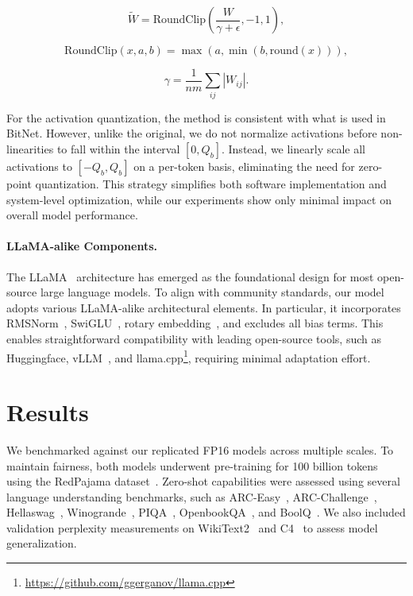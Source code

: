 \begin{equation}
    \widetilde{W} = \mathrm{RoundClip}(\frac{W}{\gamma + \epsilon}, -1, 1),
\end{equation}

\begin{equation}
    \mathrm{RoundClip}(x, a, b) = \max(a, \min(b, \mathrm{round}(x))),
\end{equation}

\begin{equation}
    \gamma = \frac{1}{nm}\sum_{ij} |W_{ij}|.
\end{equation}

For the activation quantization, the method is consistent with what is used in BitNet. However, unlike the original, we do not normalize activations before non-linearities to fall within the interval $[0, Q_b]$. Instead, we linearly scale all activations to $[-Q_b, Q_b]$ on a per-token basis, eliminating the need for zero-point quantization. This strategy simplifies both software implementation and system-level optimization, while our experiments show only minimal impact on overall model performance.

\paragraph{LLaMA-alike Components.}

The LLaMA~\cite{llama, llama2} architecture has emerged as the foundational design for most open-source large language models. To align with community standards, our  model adopts various LLaMA-alike architectural elements. In particular, it incorporates RMSNorm~\cite{rmsnorm}, SwiGLU~\cite{swiglu}, rotary embedding~\cite{rope}, and excludes all bias terms. This enables straightforward compatibility with leading open-source tools, such as Huggingface, vLLM~\cite{vllm}, and llama.cpp\footnote{\url{https://github.com/ggerganov/llama.cpp}}, requiring minimal adaptation effort.

\section{Results}

We benchmarked  against our replicated FP16  models across multiple scales. To maintain fairness, both models underwent pre-training for 100 billion tokens using the RedPajama dataset~\cite{redpajama}. Zero-shot capabilities were assessed using several language understanding benchmarks, such as ARC-Easy~\cite{arc}, ARC-Challenge~\cite{arc}, Hellaswag~\cite{hellaswag}, Winogrande~\cite{winoGrande}, PIQA~\cite{piqa}, OpenbookQA~\cite{openbookqa}, and BoolQ~\cite{boolq}. We also included validation perplexity measurements on WikiText2~\cite{wikitext2} and C4~\cite{c4} to assess model generalization.

